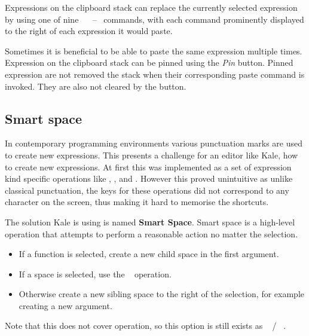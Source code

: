 Expressions on the clipboard stack can replace the currently selected
expression by using one of nine \hyperref[cmd:paste]{}~
~--~ commands, with each command prominently displayed
to the right of each expression it would paste.

Sometimes it is beneficial to be able to paste the same expression multiple
times. Expression on the clipboard stack can be pinned using the \emph{Pin}
button. Pinned expression are not removed the stack when their corresponding
paste command is invoked. They are also not cleared by the 
button.

\subsection{Smart space}
In contemporary programming environments various punctuation marks are used to
create new expressions. This presents a challenge for an editor like Kale, how
to create new expressions. At first this was implemented as a set of
expression kind specific operations like , , and . However this proved unintuitive as
unlike classical punctuation, the keys for these operations did not correspond
to any character on the screen, thus making it hard to memorise the shortcuts.

The solution Kale is using is named \textbf{Smart Space}. Smart space is a
high-level operation that attempts to perform a reasonable action no matter the
selection.
\begin{itemize}[noitemsep]
	\item If a function is selected, create a new child space in the first
argument.
	\item If a space is selected, use the
	\hyperref[cmd:up_down]{}~ operation.
	\item Otherwise create a new sibling space to the right of the selection, for
example creating a new argument.
\end{itemize}

Note that this does not cover  operation, so this option
is still exists as
\hyperref[cmd:new_line]{}~ /
\hyperref[cmd:new_line]{}~.


